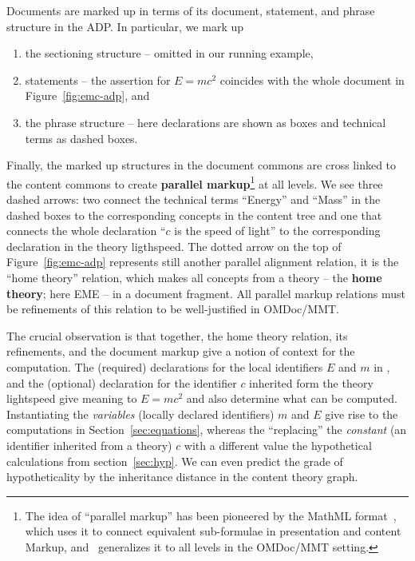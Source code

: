 Documents are marked up in terms of its document, statement, and phrase structure in the
ADP. In particular, we mark up
\begin{enumerate}
\item the sectioning structure -- omitted in our running example, 
\item statements -- the assertion for $E=mc^2$ coincides with the whole document
   in Figure~\ref{fig:emc-adp}, and
\item the phrase structure -- here declarations are shown as boxes and technical terms as
  dashed boxes.
\end{enumerate}
Finally, the marked up structures in the document commons are cross linked to the content
commons to create \textbf{parallel markup}\footnote{The idea of ``parallel markup'' has
  been pioneered by the MathML format~\cite{CarlisleEd:MathML3:base}, which uses it to
  connect equivalent sub-formulae in presentation and content Markup, and~\cite{Iancu:phd}
  generalizes it to all levels in the OMDoc/MMT setting.} at all levels. We see three
dashed arrows: two connect the technical terms ``Energy'' and ``Mass'' in the dashed boxes
to the corresponding concepts in the content tree and one that connects the whole
declaration ``$c$ is the speed of light'' to the corresponding declaration in the theory
\textsf{ligthspeed}. The dotted arrow on the top of Figure~\ref{fig:emc-adp} represents
still another parallel alignment relation, it is the ``home theory'' relation, which makes
all concepts from a theory -- the \textbf{home theory}; here \textsf{EME} -- in a document
fragment. All parallel markup relations must be refinements of this relation to be
well-justified in OMDoc/MMT.

The crucial observation is that together, the home theory relation, its refinements, and
the document markup give a notion of context for the computation. The (required)
declarations for the local identifiers $E$ and $m$ in , and the
(optional) declaration for the identifier $c$ inherited form the theory
\textsf{lightspeed} give meaning to $E=mc^2$ and also determine what can be
computed. Instantiating the \emph{variables} (locally declared identifiers) $m$ and $E$
give rise to the computations in Section~\ref{sec:equations}, whereas the ``replacing''
the \emph{constant} (an identifier inherited from a theory) $c$ with a different value the
hypothetical calculations from section~\ref{sec:hyp}. We can even predict the grade of
hypotheticality by the inheritance distance in the content theory graph.

